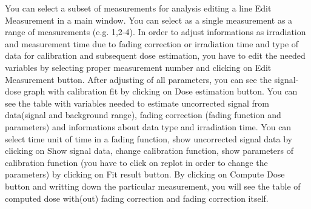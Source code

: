 You can select a subset of measurements for analysis editing a line {\ttfamily  Edit Measurement } in a main window. You can select as a single measurement as a range of measurements (e.\-g. 1,2-\/4). In order to adjust informations as irradiation and measurement time due to fading correction or irradiation time and type of data for calibration and subsequent dose estimation, you have to edit the needed variables by selecting proper measurement number and clicking on {\ttfamily Edit Measurement} button.  After adjusting of all parameters, you can see the signal-\/dose graph with calibration fit by clicking on {\ttfamily Dose estimation} button.  You can see the table with variables needed to estimate uncorrected signal from data(signal and background range), fading correction (fading function and parameters) and informations about data type and irradiation time. You can select time unit of time in a fading function, show uncorrected signal data by clicking on {\ttfamily  Show signal data}, change calibration function, show parameters of calibration function (you have to click on replot in order to change the parameters) by clicking on {\ttfamily  Fit result} button. By clicking on {\ttfamily  Compute Dose} button and writting down the particular measurement, you will see the table of computed dose with(out) fading correction and fading correction itself. \par


